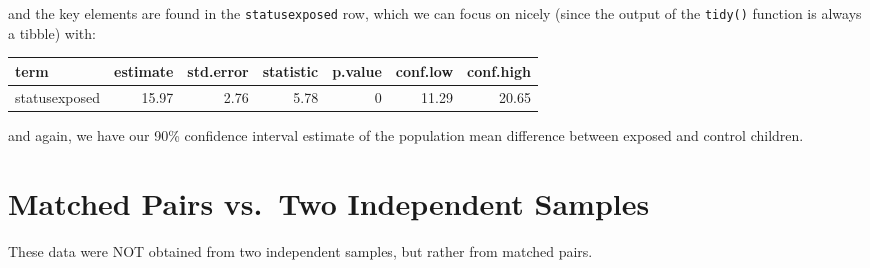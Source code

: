 \documentclass[
]{book}
\newenvironment{Shaded}{\begin{snugshade}}{\end{snugshade}}
\newcommand{\DataTypeTok}[1]{\textcolor[rgb]{0.13,0.29,0.53}{#1}}
\newcommand{\DecValTok}[1]{\textcolor[rgb]{0.00,0.00,0.81}{#1}}
\newcommand{\FloatTok}[1]{\textcolor[rgb]{0.00,0.00,0.81}{#1}}
\newcommand{\KeywordTok}[1]{\textcolor[rgb]{0.13,0.29,0.53}{\textbf{#1}}}
\newcommand{\NormalTok}[1]{#1}
\newcommand{\OperatorTok}[1]{\textcolor[rgb]{0.81,0.36,0.00}{\textbf{#1}}}
\newcommand{\OtherTok}[1]{\textcolor[rgb]{0.56,0.35,0.01}{#1}}
\newcommand{\StringTok}[1]{\textcolor[rgb]{0.31,0.60,0.02}{#1}}
\begin{document}
and the key elements are found in the \texttt{statusexposed} row, which we can focus on nicely (since the output of the \texttt{tidy()} function is always a tibble) with:

\begin{Shaded}
\end{Shaded}

\begin{tabular}{l|r|r|r|r|r|r}
\hline
term & estimate & std.error & statistic & p.value & conf.low & conf.high\\
\hline
statusexposed & 15.97 & 2.76 & 5.78 & 0 & 11.29 & 20.65\\
\hline
\end{tabular}

and again, we have our 90\% confidence interval estimate of the population mean difference between exposed and control children.

\hypertarget{matched-pairs-vs.-two-independent-samples}{%
\section{Matched Pairs vs.~Two Independent Samples}\label{matched-pairs-vs.-two-independent-samples}}

These data were NOT obtained from two independent samples, but rather from matched pairs.
\end{document}
